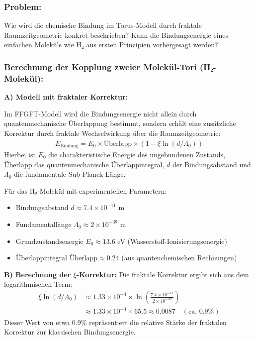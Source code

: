 \subsubsection*{Problem:}
Wie wird die chemische Bindung im Torus-Modell durch fraktale Raumzeitgeometrie konkret beschrieben? Kann die Bindungsenergie eines einfachen Moleküls wie H₂ aus ersten Prinzipien vorhergesagt werden?

\subsubsection*{Berechnung der Kopplung zweier Molekül-Tori (H₂-Molekül):}

\textbf{A) Modell mit fraktaler Korrektur:}

Im FFGFT-Modell wird die Bindungsenergie nicht allein durch quantenmechanische Überlappung bestimmt, sondern erhält eine zusätzliche Korrektur durch fraktale Wechselwirkung über die Raumzeitgeometrie:
\begin{align*}
	E_{\text{Bindung}} = E_0 \times \text{Überlapp} \times \left(1 - \xi \ln(d/\Lambda_0)\right)
\end{align*}
Hierbei ist $E_0$ die charakteristische Energie des ungebundenen Zustands, $\text{Überlapp}$ das quantenmechanische Überlappintegral, $d$ der Bindungsabstand und $\Lambda_0$ die fundamentale Sub-Planck-Länge.

Für das H₂-Molekül mit experimentellen Parametern:
\begin{itemize}
	\item Bindungsabstand $d \approx 7.4 \times 10^{-11}$ m
	\item Fundamentallänge $\Lambda_0 \approx 2 \times 10^{-39}$ m
	\item Grundzustandsenergie $E_0 \approx 13.6$ eV (Wasserstoff-Ionisierungsenergie)
	\item Überlappintegral $\text{Überlapp} \approx 0.24$ (aus quantenchemischen Rechnungen)
\end{itemize}

\textbf{B) Berechnung der $\xi$-Korrektur:}
Die fraktale Korrektur ergibt sich aus dem logarithmischen Term:
\begin{align*}
	\xi \ln(d/\Lambda_0) &\approx 1.33 \times 10^{-4} \times \ln\left(\frac{7.4 \times 10^{-11}}{2 \times 10^{-39}}\right) \\
	&\approx 1.33 \times 10^{-4} \times 65.5 \approx 0.0087 \quad (\text{ca. } 0.9\%)
\end{align*}
Dieser Wert von etwa 0.9\% repräsentiert die relative Stärke der fraktalen Korrektur zur klassischen Bindungsenergie.

